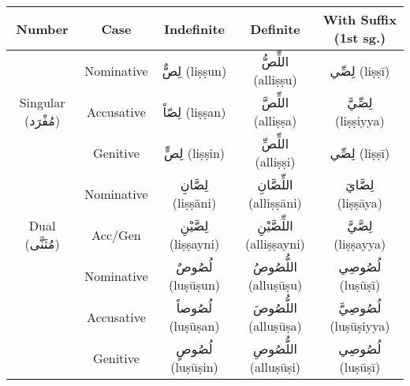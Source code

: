 \documentclass[letterpaper,12pt]{article}
\begin{document}
\begin{tabular}{|c|c|c|c|c|}
\hline
\textbf{Number} & \textbf{Case} & \textbf{Indefinite} & \textbf{Definite} & \textbf{With Suffix (1st sg.)} \\
\hline
\multirow{3}{*}{Singular (\textarabic{مُفْرَد})} 
 & Nominative   & \textarabic{لِصٌّ} (liṣṣun) & \textarabic{اللِّصُّ} (alliṣṣu) & \textarabic{لِصِّي} (liṣṣī) \\
 & Accusative   & \textarabic{لِصّاً} (liṣṣan) & \textarabic{اللِّصَّ} (alliṣṣa) & \textarabic{لِصِّيَّ} (liṣṣiyya) \\
 & Genitive     & \textarabic{لِصٍّ} (liṣṣin) & \textarabic{اللِّصِّ} (alliṣṣi) & \textarabic{لِصِّي} (liṣṣī) \\
\hline
\multirow{3}{*}{Dual (\textarabic{مُثَنَّى})} 
 & Nominative   & \textarabic{لِصَّانِ} (liṣṣāni) & \textarabic{اللِّصَّانِ} (alliṣṣāni) & \textarabic{لِصَّايَ} (liṣṣāya) \\
 & Acc/Gen      & \textarabic{لِصَّيْنِ} (liṣṣayni) & \textarabic{اللِّصَّيْنِ} (alliṣṣayni) & \textarabic{لِصَّيَّ} (liṣṣayya) \\
\hline
\multirow{3}{*}{Plural (\textarabic{جَمْع})} 
  & Nominative    & \textarabic{لُصُوصٌ} (luṣūṣun) & \textarabic{اللُّصُوصُ} (alluṣūṣu) & \textarabic{لُصُوصِي} (luṣūṣī) \\
  & Accusative      & \textarabic{لُصُوصاً} (luṣūṣan) & \textarabic{اللُّصُوصَ} (alluṣūṣa) & \textarabic{لُصُوصِيَّ} (luṣūṣiyya) \\
  & Genitive          & \textarabic{لُصُوصٍ} (luṣūṣin) & \textarabic{اللُّصُوصِ} (alluṣūṣi) & \textarabic{لُصُوصِي} (luṣūṣī) \\
\hline
\end{tabular}
\end{document}
